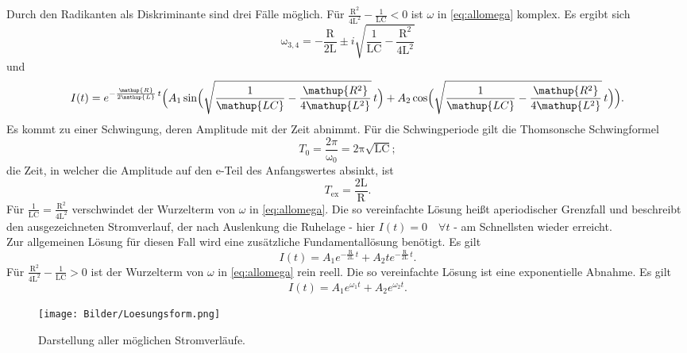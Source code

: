 Durch den Radikanten als Diskriminante sind drei Fälle möglich.
Für $\frac{\mathup{R^2}}{4\mathup{L^2}}-\frac{1}{\mathup{LC}}<0$ ist $\omega$ in \eqref{eq:allomega} komplex.
Es ergibt sich
\begin{equation}
	\mathup{\omega_{3,4}}= -\frac{\mathup{R}}{2\mathup{L}}\pm i\sqrt{\frac{1}{\mathup{LC}}-\frac{\mathup{R^2}}{4\mathup{L^2}}}
\end{equation}
und
\begin{equation}
	I(t) = e^{-\frac{\mathup{R}}{2\mathup{L}}\,t}\Bigl(A_1 \sin\Bigl(\sqrt{\frac{1}{\mathup{LC}}-\frac{\mathup{R^2}}{4\mathup{L^2}}}\, t\Bigr)+A_2 \cos\Bigl(\sqrt{\frac{1}{\mathup{LC}}-\frac{\mathup{R^2}}{4\mathup{L^2}}}\,t\Bigr)\Bigr).
	\label{eq:schwingloesung}
\end{equation}
Es kommt zu einer Schwingung, deren Amplitude mit der Zeit abnimmt. 
Für die Schwingperiode gilt die Thomsonsche Schwingformel
\begin{equation}
	T_0 = \frac{2π}{\mathup{ω_0}} = \mathup{2π \sqrt{LC}};
	\label{eq:thomson}
\end{equation} 
die Zeit, in welcher die Amplitude auf den e-Teil des Anfangswertes absinkt, ist
\begin{equation}
	T_\text{ex} = \frac{\text{2L}}{\text{R}}.
	\label{eq:abkling}
\end{equation}
Für $\frac{1}{\mathup{LC}}=\frac{\mathup{R^2}}{4\mathup{L^2}}$ 
verschwindet der Wurzelterm von $\omega$ in \eqref{eq:allomega}.
Die so vereinfachte Lösung heißt aperiodischer Grenzfall und beschreibt den ausgezeichneten Stromverlauf, der nach Auslenkung die Ruhelage - hier $I(t)=0 \quad\forall t$ - am Schnellsten wieder erreicht.\\
Zur allgemeinen Lösung für diesen Fall wird eine zusätzliche Fundamentallösung benötigt.
Es gilt
\begin{equation}
	I(t) = A_1 e^{-\frac{\mathup{R}}{2\mathup{L}}\,t}+A_2 t e^{-\frac{\mathup{R}}{2\mathup{L}}\,t}.
\end{equation}
Für $\frac{\mathup{R^2}}{4\mathup{L^2}}-\frac{1}{\mathup{LC}}>0$ 
ist der Wurzelterm von $\omega$ in \eqref{eq:allomega} rein reell.
Die so vereinfachte Lösung ist eine exponentielle Abnahme.
Es gilt
\begin{equation}
	I(t)= A_1 e^{\omega_1 t} + A_2 e^{\omega_2 t}.
\end{equation}
\begin{figure}
	\centering
	\texttt{[image: Bilder/Loesungsform.png]}
	\caption{Darstellung aller möglichen Stromverläufe. \cite{v354}}
\end{figure}

